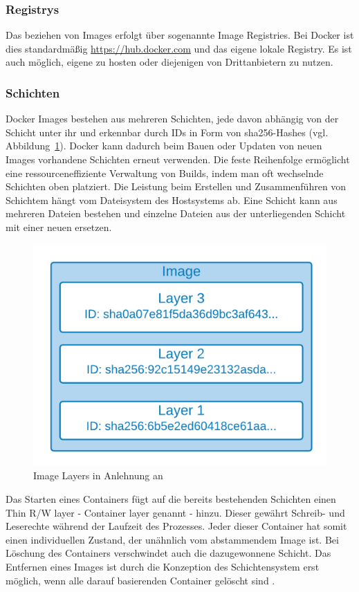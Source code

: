 \subsubsection{Registrys}
Das beziehen von Images erfolgt über sogenannte \glqq Image Registries\grqq{}.
Bei Docker ist dies standardmäßig \url{https://hub.docker.com} und das eigene lokale Registry. 
Es ist auch möglich, eigene zu hosten oder diejenigen von Drittanbietern zu nutzen.

\subsubsection{Schichten}
Docker Images bestehen aus mehreren Schichten, jede davon abhängig von der Schicht unter ihr und
erkennbar durch IDs in Form von \acs{sha}256-Hashes (vgl. Abbildung~\ref{fig:dockerlayer}).
Docker kann dadurch beim Bauen oder Updaten von neuen Images vorhandene Schichten erneut verwenden. 
Die feste Reihenfolge ermöglicht eine ressourceneffiziente Verwaltung von Builds,
indem man oft wechselnde Schichten oben platziert. 
Die Leistung beim Erstellen und Zusammenführen von Schichtem hängt vom Dateisystem des Hostsystems ab.
Eine Schicht kann aus mehreren Dateien bestehen
und einzelne Dateien aus der unterliegenden Schicht mit einer neuen ersetzen.

\begin{figure}
    \centering
    \includegraphics[width=0.5\columnwidth]{images/Image-Layer.png}
    \caption{Image Layers in Anlehnung an \protect\cite[S.61]{dockerdeep}}
    \label{fig:dockerlayer}
\end{figure}


Das Starten eines Containers fügt auf die bereits bestehenden Schichten einen \glqq Thin R/W layer\grqq{} 
- \glqq Container layer\grqq{} genannt - hinzu. Dieser gewährt Schreib- und Leserechte während der Laufzeit des Prozesses. 
Jeder dieser Container hat somit einen individuellen Zustand, der unähnlich vom abstammendem Image ist.
Bei Löschung des Containers verschwindet auch die dazugewonnene Schicht.
Das Entfernen eines Images ist durch die Konzeption des Schichtensystem erst möglich, wenn alle darauf
basierenden Container gelöscht sind \cite{dockerstoragedriver}.

